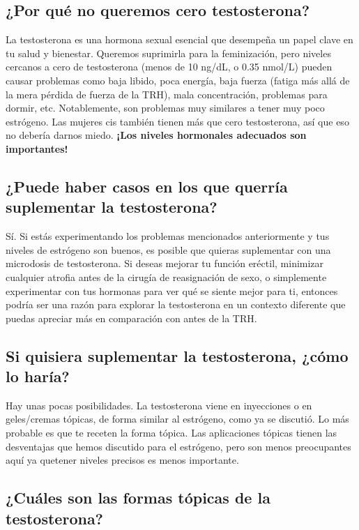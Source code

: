 \documentclass{article}
\begin{document}
\subsection{¿Por qué no queremos cero testosterona?}

La testosterona es una hormona sexual esencial que desempeña un papel clave en tu salud y bienestar. Queremos suprimirla para la feminización, pero niveles cercanos a cero de testosterona (menos de 10 ng/dL, o 0.35 nmol/L) pueden causar problemas como baja libido, poca energía, baja fuerza (fatiga más allá de la mera pérdida de fuerza de la TRH), mala concentración, problemas para dormir, etc. Notablemente, son problemas muy similares a tener muy poco estrógeno. Las mujeres cis también tienen más que cero testosterona, así que eso no debería darnos miedo. \textbf{¡Los niveles hormonales adecuados son importantes!}

\subsection{¿Puede haber casos en los que querría suplementar la testosterona?}\label{9-2}

Sí. Si estás experimentando los problemas mencionados anteriormente y tus niveles de estrógeno son buenos, es posible que quieras suplementar con una microdosis de testosterona. Si deseas mejorar tu función eréctil, minimizar cualquier atrofia antes de la cirugía de reasignación de sexo, o simplemente experimentar con tus hormonas para ver qué se siente mejor para ti, entonces podría ser una razón para explorar la testosterona en un contexto diferente que puedas apreciar más en comparación con antes de la TRH.

\subsection{Si quisiera suplementar la testosterona, ¿cómo lo haría?}

Hay unas pocas posibilidades. La testosterona viene en inyecciones o en geles/cremas tópicas, de forma similar al estrógeno, como ya se discutió. Lo más probable es que te receten la forma tópica. Las aplicaciones tópicas tienen las desventajas que hemos discutido para el estrógeno, pero son menos preocupantes aquí ya quetener niveles precisos es menos importante.

\subsection{¿Cuáles son las formas tópicas de la testosterona?}
\end{document}
